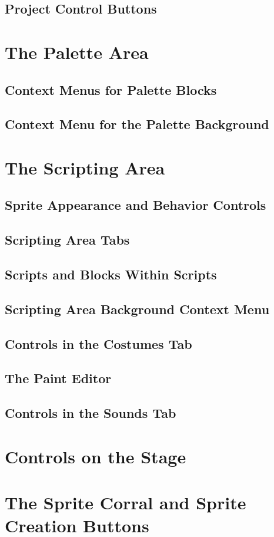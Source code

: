 \documentclass{report}
\begin{document}
\subsection{Project Control Buttons}
\section{The Palette Area}
\subsection{Context Menus for Palette Blocks}
\subsection{Context Menu for the Palette Background}
\section{The Scripting Area}
\subsection{Sprite Appearance and Behavior Controls}
\subsection{Scripting Area Tabs}
\subsection{Scripts and Blocks Within Scripts}
\subsection{Scripting Area Background Context Menu}
\subsection{Controls in the Costumes Tab}
\subsection{The Paint Editor}
\subsection{Controls in the Sounds Tab}
\section{Controls on the Stage}
\section{The Sprite Corral and Sprite Creation Buttons}
\end{document}
